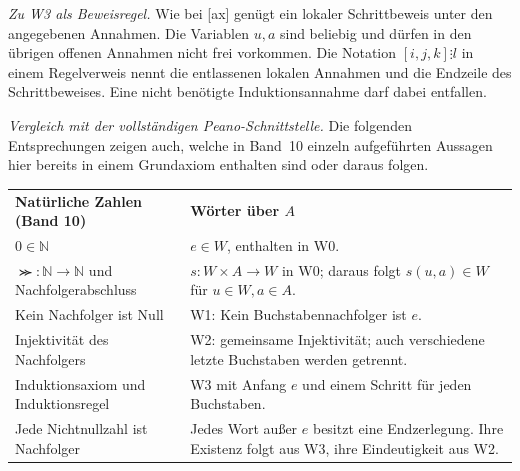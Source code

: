 \noindent\begin{minipage}{\linewidth}

\smallskip\noindent\textit{Zu W3 als Beweisregel.}
Wie bei [ax] genügt ein lokaler
Schrittbeweis unter den angegebenen Annahmen. Die Variablen \(u,a\)
sind beliebig und dürfen in den übrigen offenen Annahmen nicht frei
vorkommen. Die Notation \([i,j,k]\vdots l\) in einem Regelverweis nennt
die entlassenen lokalen Annahmen und die Endzeile des Schrittbeweises.
Eine nicht benötigte Induktionsannahme darf dabei entfallen.
\end{minipage}\par

\medskip\noindent\textit{Vergleich mit der vollständigen Peano-Schnittstelle.}
Die folgenden Entsprechungen zeigen auch, welche in Band~10 einzeln
aufgeführten Aussagen hier bereits in einem Grundaxiom enthalten sind
oder daraus folgen.

\begingroup
\renewcommand{\arraystretch}{1.2}
\noindent\begin{tabular}{@{}p{.37\linewidth}p{.58\linewidth}@{}}
\textbf{Natürliche Zahlen (Band 10)} & \textbf{Wörter über \(A\)} \\
\(0\in\mathbb N\) & \(e\in W\), enthalten in W0. \\
\(\Succ\colon\mathbb N\to\mathbb N\) und Nachfolgerabschluss &
\(s\colon W\times A\to W\) in W0; daraus folgt
\(s(u,a)\in W\) für \(u\in W,a\in A\). \\
Kein Nachfolger ist Null & W1: Kein Buchstabennachfolger ist \(e\). \\
Injektivität des Nachfolgers & W2: gemeinsame Injektivität;
auch verschiedene letzte Buchstaben werden getrennt. \\
Induktionsaxiom und Induktionsregel & W3 mit Anfang \(e\) und einem
Schritt für jeden Buchstaben. \\
Jede Nichtnullzahl ist Nachfolger & Jedes Wort außer \(e\) besitzt eine
Endzerlegung. Ihre Existenz folgt aus W3, ihre Eindeutigkeit aus W2.
\end{tabular}\par
\endgroup

